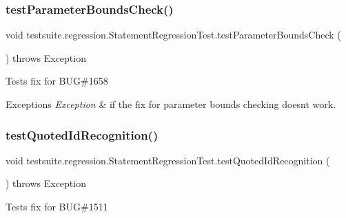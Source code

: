 \subsubsection{\texorpdfstring{test\+Parameter\+Bounds\+Check()}{testParameterBoundsCheck()}}
{\footnotesize\ttfamily void testsuite.\+regression.\+Statement\+Regression\+Test.\+test\+Parameter\+Bounds\+Check (\begin{DoxyParamCaption}{ }\end{DoxyParamCaption}) throws Exception}

Tests fix for B\+UG\#1658


\begin{DoxyExceptions}{Exceptions}
{\em Exception} & if the fix for parameter bounds checking doesn\textquotesingle{}t work. \\
\hline
\end{DoxyExceptions}
\mbox{\label{classtestsuite_1_1regression_1_1_statement_regression_test_a0ba6d0aec28125228d181d3e3f340247}} 
\subsubsection{\texorpdfstring{test\+Quoted\+Id\+Recognition()}{testQuotedIdRecognition()}}
{\footnotesize\ttfamily void testsuite.\+regression.\+Statement\+Regression\+Test.\+test\+Quoted\+Id\+Recognition (\begin{DoxyParamCaption}{ }\end{DoxyParamCaption}) throws Exception}

Tests fix for B\+UG\#1511


